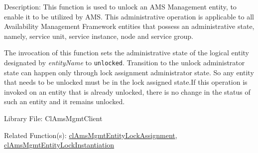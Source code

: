 \begin{Desc}
\item[Description:]This function is used to unlock an AMS Management entity, to enable it to be utilized by AMS. This administrative operation is applicable to all Availability Management Framework entities that possess an administrative state, namely, service unit, service instance, node and service group. \par
 \par
 The invocation of this function sets the administrative state of the logical entity designated by {\em entity\-Name\/} to {\tt unlocked}. Transition to the unlock administrator state can happen only through lock assignment administrator state. So any entity that needs to be unlocked must be in the lock assigned state.If this operation is invoked on an entity that is already unlocked, there is no change in the status of such an entity and it remains unlocked.\end{Desc}
\begin{Desc}
\item[Library File:]Cl\-Ams\-Mgmt\-Client\end{Desc}
\begin{Desc}
\item[Related Function(s):]\hyperlink{pageams110}{cl\-Ams\-Mgmt\-Entity\-Lock\-Assignment}, 
\hyperlink{pageams111}{cl\-Ams\-Mgmt\-Entity\-Lock\-Instantiation} \end{Desc}

\newpage
